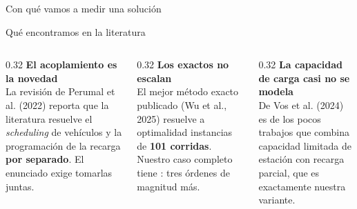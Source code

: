 \documentclass[aspectratio=169,11pt]{beamer}
\newcommand{\RES}{../../03-resultados}
\begin{document}
\begin{frame}{Con qué vamos a medir una solución}
  \scriptsize
  
  \vspace{3pt}
\end{frame}

\begin{frame}{Qué encontramos en la literatura}
  \small
  \begin{columns}[t]
    \begin{column}{0.32\textwidth}
      {\color{ink}\bfseries El acoplamiento es la novedad}
      \footnotesize\\[3pt]
      La revisión de Perumal et al. (2022) reporta que la literatura resuelve
      el \textit{scheduling} de vehículos y la programación de la recarga
      \textbf{por separado}. El enunciado exige tomarlas juntas.
    \end{column}
    \begin{column}{0.32\textwidth}
      {\color{ink}\bfseries Los exactos no escalan}
      \footnotesize\\[3pt]
      El mejor método exacto publicado (Wu et al., 2025) resuelve a optimalidad
      instancias de \textbf{101 corridas}. Nuestro caso completo tiene
      \corridasReales{}: tres órdenes de magnitud más.
    \end{column}
    \begin{column}{0.32\textwidth}
      {\color{ink}\bfseries La capacidad de carga casi no se modela}
      \footnotesize\\[3pt]
      De Vos et al. (2024) es de los pocos trabajos que combina capacidad
      limitada de estación con recarga parcial, que es exactamente nuestra
      variante.
    \end{column}
  \end{columns}
\end{frame}
\end{document}
